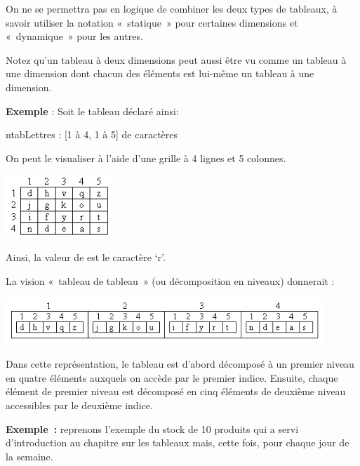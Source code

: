 	On ne se permettra pas en logique de
	combiner les deux types de tableaux, à savoir utiliser la notation
	«~statique~» pour certaines dimensions et «~dynamique~» pour les
	autres.

	Notez qu'un tableau à deux dimensions peut aussi être
	vu comme un tableau à une dimension dont chacun des éléments est
	lui-même un tableau à une dimension.

	\textbf{Exemple} : Soit le tableau déclaré ainsi:

	\begin{Pseudocode}
	\Decl ntabLettres : [1 à 4, 1 à 5] de caractères
	\end{Pseudocode}

	On peut le visualiser à l’aide d’une grille à 4 lignes et 5 colonnes.

	\begin{center}
	\includegraphics[width=4cm]{image/tab2d-vision-tab2d}
	\end{center}

	Ainsi, la valeur de  
	est le caractère ‘r’. 
	
	La vision «~tableau de tableau~» 
	(ou décomposition en niveaux)
	donnerait :

	\begin{center}
	\includegraphics[width=0.9\textwidth]{image/tab2d-vision-tabtab}
	\end{center}

	Dans cette représentation, le tableau  est
	d’abord décomposé à un premier niveau en quatre éléments auxquels on
	accède par le premier indice. Ensuite, chaque élément de premier niveau
	est décomposé en cinq éléments de deuxième niveau accessibles par le
	deuxième indice.
	
	\textbf{Exemple~:} reprenons l'exemple du stock de 10 produits
	qui a servi d'introduction au chapitre sur les tableaux
	mais, cette fois, pour chaque jour de la semaine.
	
